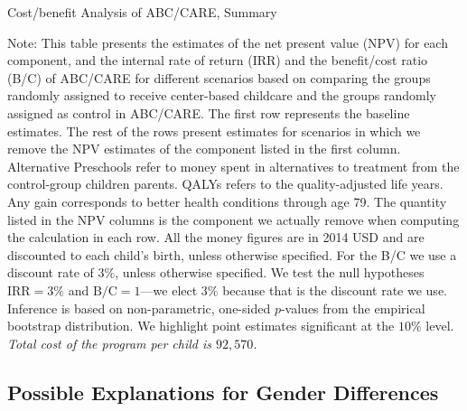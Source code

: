\begin{table}[!htbp]
\centering
\caption{Cost/benefit Analysis of ABC/CARE, Summary}\label{table:cba}
\begin{adjustbox}{max width=\textwidth}
\begin{threeparttable}

\begin{tablenotes}
\footnotesize
\item Note: This table presents the estimates of the net present value (NPV) for each component, and the internal rate of return (IRR) and the benefit/cost ratio (B/C) of ABC/CARE for different scenarios based on comparing the groups randomly assigned to receive center-based childcare and the groups randomly assigned as control in ABC/CARE. The first row represents the baseline estimates. The rest of the rows present estimates for scenarios in which we remove the NPV estimates of the component listed in the first column. Alternative Preschools refer to money spent in alternatives to treatment from the control-group children parents. QALYs refers to the quality-adjusted life years. Any gain corresponds to better health conditions through age 79. The quantity listed in the NPV columns is the component we actually remove when computing the calculation in each row. All the money figures are in 2014 USD and are discounted to each child's birth, unless otherwise specified. For the B/C we use a discount rate of $3\%$, unless otherwise specified. We test the null hypotheses $\text{IRR} = 3\%$ and $\text{B/C} = 1$---we elect $3\%$ because that is the discount rate we use. Inference is based on non-parametric, one-sided $p$-values from the empirical bootstrap distribution. We highlight point estimates significant at the $10\%$ level.\\
\textit{Total cost of the program per child is $92,570$.}
\end{tablenotes}
\end{threeparttable}
\end{adjustbox}
\end{table}

\subsection{Possible Explanations for Gender Differences}

